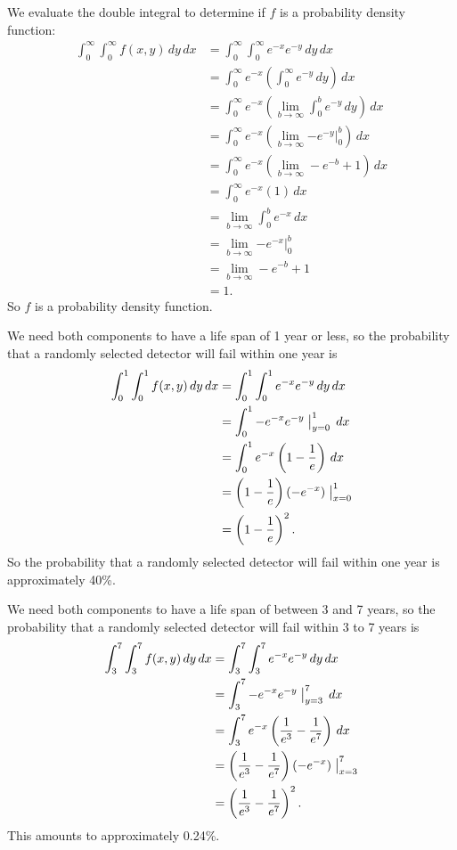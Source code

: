 \begin{activitySolution}
\ba
\item We evaluate the double integral to determine if $f$ is a probability density function:
\begin{align*}
\int_0^{\infty} \int_0^{\infty} f(x,y) \, dy \, dx &= \int_0^{\infty} \int_0^{\infty} e^{-x} e^{-y} \, dy \, dx \\
	&= \int_0^{\infty} e^{-x} \left( \int_0^{\infty}  e^{-y} \, dy \right) \, dx \\
	&= \int_0^{\infty} e^{-x} \left(\lim_{b \to \infty} \int_0^{b}  e^{-y} \, dy \right) \, dx \\
	&= \int_0^{\infty} e^{-x} \left(\lim_{b \to \infty} \left. -e^{-y} \right|_0^{b} \right) \, dx \\
	&= \int_0^{\infty} e^{-x} \left(\lim_{b \to \infty} -e^{-b}+1 \right) \, dx \\
	&= \int_0^{\infty} e^{-x} (1) \, dx \\
	&= \lim_{b \to \infty} \int_0^{b}  e^{-x} \, dx \\
	&= \lim_{b \to \infty} \left. -e^{-x} \right|_0^{b} \\
	&= \lim_{b \to \infty} -e^{-b}+1 \\
	&= 1.
\end{align*}
So $f$ is a probability density function.
	

\item We need both components to have a life span of 1 year or less, so the probability that a randomly selected detector will fail within one year is
\begin{align*}
\int_0^1 \int_0^1 f(x,y) \, dy \, dx &= \int_0^1 \int_0^1 e^{-x} e^{-y} \, dy \, dx \\
	&= \int_0^1  -e^{-x} e^{-y} \bigm|_{y=0}^1 \, dx \\
	&= \int_0^1  e^{-x} \left(1-\frac{1}{e}\right) \, dx \\
	&= \left(1-\frac{1}{e}\right) (-e^{-x})\bigm|_{x=0}^1 \\
	&= \left(1-\frac{1}{e}\right)^2.
\end{align*}
So the probability that a randomly selected detector will fail within one year is approximately 40\%.

\item We need both components to have a life span of between 3 and 7 years, so the probability that a randomly selected detector will fail within 3 to 7 years is
\begin{align*}
\int_3^7 \int_3^7 f(x,y) \, dy \, dx &= \int_3^7 \int_3^7 e^{-x} e^{-y} \, dy \, dx \\
	&= \int_3^7  -e^{-x} e^{-y} \bigm|_{y=3}^7 \, dx \\
	&= \int_3^7  e^{-x} \left(\frac{1}{e^3}-\frac{1}{e^7}\right) \, dx \\
	&= \left(\frac{1}{e^3}-\frac{1}{e^7}\right) (-e^{-x})\bigm|_{x=3}^7 \\
	&= \left(\frac{1}{e^3}-\frac{1}{e^7}\right)^2.
\end{align*}
This amounts to approximately 0.24\%. 


\end{activitySolution}

